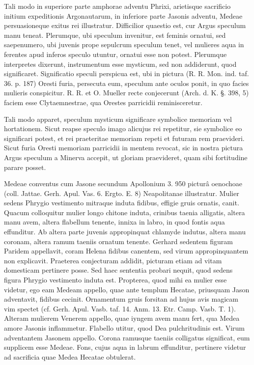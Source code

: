 \documentclass[landscape, a4paper, 11pt, oneside, polutonikogreek, german]{article}
\begin{document}
Tali modo in superiore parte amphorae adventu Phrixi, arietisque sacrificio initium expeditionis Argonautarum, in inferiore parte Jasonis adventu, Medeae persuasioneque exitus rei illustratur. Difficilior quaestio est, cur Argus speculum manu teneat. Plerumque, ubi speculum invenitur, est feminis ornatui, sed saepenumero, ubi juvenis prope sepulcrum speculum tenet, vel mulieres aqua in ferentes apud inferos speculo utuntur, ornatui esse non potest. Plerumque interpretes dixerunt, instrumentum esse mysticum, sed non addiderunt, quod significaret. Significatio speculi perspicua est, ubi in pictura (R. R. Mon. ind. taf. 36. p. 187) Oresti furia, persecuta eum, speculum ante oculos ponit, in quo facies mulieris conspicitur. R. R. et O. Mueller recte conjecerunt (Arch. d. K. §. 398, 5) faciem esse Clytaemnestrae, qua Orestes parricidii reminisceretur.

Tali modo apparet, speculum mysticum significare symbolice memoriam vel hortationem. Sicut reapse speculo imago alicujus rei repetitur, sie symbolice eo significari potest, et rei praeteritae memoriam repeti et futuram rem praevideri. Sicut furia Oresti memoriam parricidii in mentem revocat, sic in nostra pictura Argus speculum a Minerva accepit, ut gloriam praevideret, quam sibi fortitudine parare posset.

Medeae conventus cum Jasone secundum Apollonium 3. 950 picturâ oenochoae (coll. Jattae. Gerh. Apul. Vas. 6. Ergto. E. 8) Neapolitanae illustratur. Mulier sedens Phrygio vestimento mitraque induta fidibus, effigie gruis ornatis, canit. Quacum colloquitur mulier longo chitone induta, crinibus taenia alligatis, altera manu avem, altera flabellum tenente, innixa in labro, in quod fontis aqua effunditur. Ab altera parte juvenis appropinquat chlamyde indutus, altera manu coronam, altera ramum taeniis ornatum tenente. Gerhard sedentem figuram Paridem appellavit, coram Helena fidibus canentem, sed virum appropinquantem non explicavit. Praeterea conjecturam addidit, picturam etiam ad vitam domesticam pertinere posse. Sed haec sententia probari nequit, quod sedens figura Phrygio vestimento induta est. Propterea, quod mihi ea mulier esse videtur, ego eam Medeam appello, quae ante templum Hecatae, priusquam Jason adventavit, fidibus cecinit. Ornamentum gruis forsitan ad hujus avis magicam vim spectet (cf. Gerh. Apul. Vasb. taf. 14. Anm. 13. Etr. Camp. Vasb. T. 1). Alteram mulierem Venerem appello, quae iyngem avem manu fert, qua Medea amore Jasonis inflammetur. Flabello utitur, quod Dea pulchritudinis est. Virum adventantem Jasonem appello. Corona ramusque taeniis colligatus significat, eum supplicem esse Medeae. Fons, cujus aqua in labrum effunditur, pertinere videtur ad sacrificia quae Medea Hecatae obtulerat.
\end{document}
